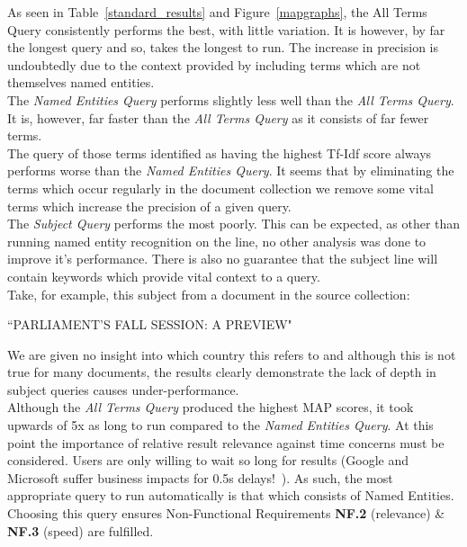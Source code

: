 \documentclass{l4proj}
\begin{document}
As seen in Table~\ref{standard_results} and Figure~\ref{mapgraphs}, the All Terms Query consistently performs the best, with little variation. It is however, by far the longest query and so, takes the longest to run. The increase in precision is undoubtedly due to the context provided by including terms which are not themselves named entities. \\
The \textit{Named Entities Query} performs slightly less well than the \textit{All Terms Query}. It is, however, far faster than the \textit{All Terms Query} as it consists of far fewer terms. \\
The query of those terms identified as having the highest Tf-Idf score always performs worse than the \textit{Named Entities Query}. It seems that by eliminating the terms which occur regularly in the document collection we remove some vital terms which increase the precision of a given query. \\
The \textit{Subject Query} performs the most poorly.  This can be expected, as other than running named entity recognition on the line, no other analysis was done to improve it's performance. There is also no guarantee that the subject line will contain keywords which provide vital context to a query.\\
Take, for example, this subject from a document in the source collection:
\begin{center}``PARLIAMENT'S FALL SESSION: A PREVIEW"\end{center}
We are given no insight into which country this refers to and although this is not true for many documents, the results clearly demonstrate the lack of depth in subject queries causes under-performance.\\
Although the \textit{All Terms Query} produced the highest MAP scores, it took upwards of 5x as long to run compared to the \textit{Named Entities Query}. At this point the importance of relative result relevance against time concerns must be considered. Users are only willing to wait so long for results (Google and Microsoft suffer business impacts for 0.5s delays!~\cite{performance}). 
As such, the most appropriate query to run automatically is that which consists of Named Entities. Choosing this query ensures Non-Functional Requirements \textbf{NF.2} (relevance) \& \textbf{NF.3} (speed) are fulfilled.
\end{document}
